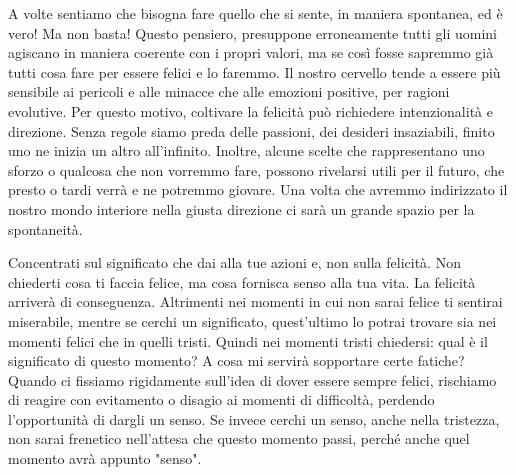 \documentclass[12pt]{book} %
\begin{document}
A volte sentiamo che bisogna fare quello che si sente, in maniera spontanea, ed è vero! Ma non basta! Questo pensiero,
presuppone erroneamente tutti gli uomini agiscano in maniera coerente con i propri valori, ma se così fosse sapremmo
già tutti cosa fare per essere felici e lo faremmo. Il nostro cervello tende a essere più sensibile ai pericoli e alle minacce che alle emozioni positive, per ragioni evolutive. Per questo motivo, coltivare la felicità può richiedere intenzionalità e direzione. Senza regole siamo preda delle passioni, dei desideri
insaziabili, finito uno ne inizia un altro all'infinito. Inoltre, alcune scelte che rappresentano
uno sforzo o qualcosa che non vorremmo fare, possono rivelarsi utili per il futuro, che presto o tardi verrà e ne
potremmo giovare. Una volta che avremmo indirizzato il nostro mondo interiore nella giusta direzione ci sarà un grande
spazio per la spontaneità.

Concentrati sul significato che dai alla tue azioni e, non sulla felicità. Non chiederti cosa ti faccia felice, ma cosa
fornisca senso alla tua vita. La felicità arriverà di conseguenza.
Altrimenti nei momenti in cui non sarai felice ti sentirai miserabile, mentre se cerchi un significato, quest'ultimo lo potrai trovare sia nei momenti felici che in quelli tristi. Quindi nei momenti tristi chiedersi: qual è il significato di questo momento? A cosa mi servirà sopportare certe fatiche?
Quando ci fissiamo rigidamente sull’idea di dover essere sempre felici, rischiamo di reagire con evitamento o disagio ai momenti di difficoltà, perdendo l’opportunità di dargli un senso.
Se invece cerchi un senso, anche nella tristezza, non sarai frenetico nell'attesa che questo momento passi, perché anche quel momento avrà appunto "senso".
\end{document}
